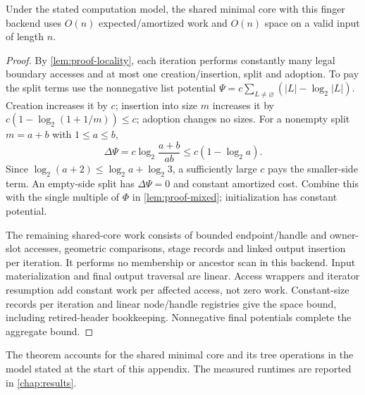 \begin{theorem}
\label{thm:proof-total}
Under the stated computation model, the shared minimal core with this
finger backend uses $O(n)$ expected/amortized work and $O(n)$ space on
a valid input of length $n$.
\end{theorem}
\begin{proof}
By \cref{lem:proof-locality}, each iteration performs constantly many legal
boundary accesses and at most one creation/insertion, split and adoption.
To pay the split terms use the nonnegative list potential
$\Psi=c\sum_{L\ne\varnothing}(|L|-\log_2|L|)$.
Creation increases it by $c$; insertion into size $m$ increases it by
$c(1-\log_2(1+1/m))\leq c$; adoption changes no sizes. For a nonempty
split $m=a+b$ with $1\leq a\leq b$,
\[
 \Delta\Psi=c\log_2\frac{a+b}{ab}
       \leq c(1-\log_2 a).
\]
Since $\log_2(a+2)\leq\log_2a+\log_2 3$, a sufficiently large $c$
pays the smaller-side term. An empty-side split has $\Delta\Psi=0$ and
constant amortized cost. Combine this with the single multiple of $\Phi$
in \cref{lem:proof-mixed}; initialization has constant potential.

The remaining shared-core work consists of bounded endpoint/handle and
owner-slot accesses, geometric comparisons, stage records and linked output
insertion per iteration. It performs no membership or ancestor scan in this
backend. Input materialization and final output traversal are linear.
Access wrappers and iterator resumption add constant work per affected access,
not zero work. Constant-size records per iteration and linear node/handle
registries give the space bound, including retired-header bookkeeping.
Nonnegative final potentials complete the aggregate bound.
\end{proof}

The theorem accounts for the shared minimal core and its tree operations in
the model stated at the start of this appendix. The measured runtimes are
reported in \cref{chap:results}.
